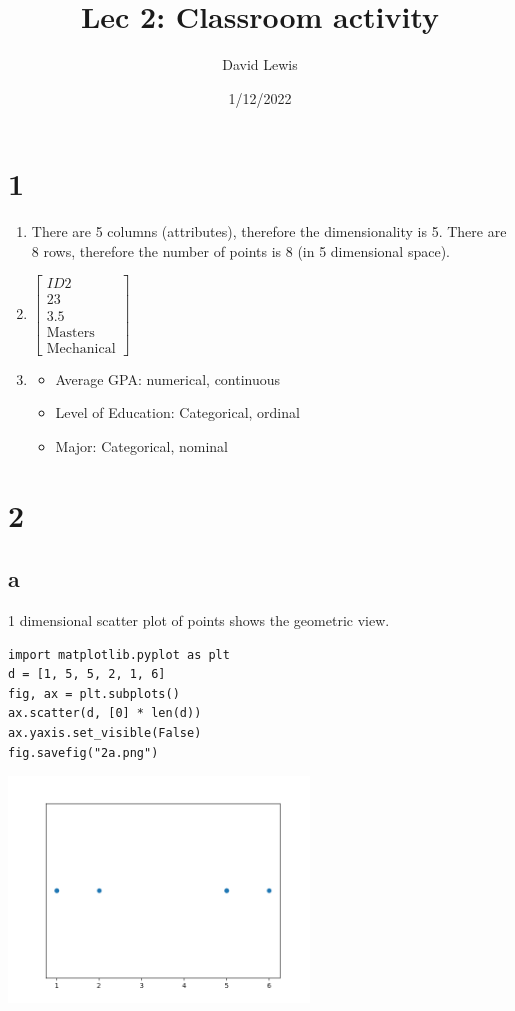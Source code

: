 \documentclass[11pt]{article}
\author{David Lewis}
\date{1/12/2022}
\title{Lec 2: Classroom activity}
\begin{document}
\maketitle
\section{1}
\label{sec:orgfdc685c}
\begin{enumerate}
\item There are 5 columns (attributes), therefore the dimensionality is 5. There are 8 rows,
therefore the number of points is 8 (in 5 dimensional space).
\item \(\begin{bmatrix} ID2 \\ 23 \\3.5 \\ \text{Masters} \\ \text{Mechanical}\end{bmatrix}\)
\item \begin{itemize}
\item Average GPA: numerical, continuous
\item Level of Education: Categorical, ordinal
\item Major: Categorical, nominal
\end{itemize}
\end{enumerate}
\section{2}
\label{sec:org7431544}
\subsection{a}
\label{sec:orgf4362ae}
1 dimensional scatter plot of points shows the geometric view.
\begin{verbatim}
import matplotlib.pyplot as plt
d = [1, 5, 5, 2, 1, 6]
fig, ax = plt.subplots()
ax.scatter(d, [0] * len(d))
ax.yaxis.set_visible(False)
fig.savefig("2a.png")
\end{verbatim}

\begin{center}
\includegraphics[width=8cm]{2a.png}
\end{center}
\end{document}
